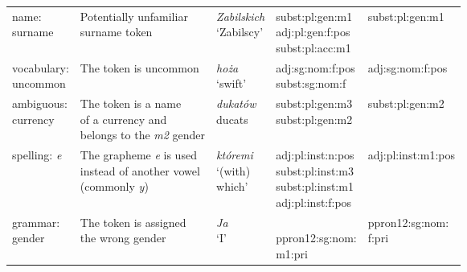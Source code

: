 \begin{longtable}[H]{p{2cm}p{4cm}p{1.5cm}p{3cm}p{3cm}}
\makecell[l]{name: \\ surname} & \makecell[l]{Potentially unfamiliar \\ surname token}  & \makecell[l]{\textit{Zabilskich} \\ `Zabilscy'} & \makecell[l]{subst:pl:gen:m1 \\ adj:pl:gen:f:pos \\ subst:pl:acc:m1} & subst:pl:gen:m1 \\ 

\makecell[l]{vocabulary: \\ uncommon} & The token is uncommon & \makecell[l]{\textit{hoża} \\ `swift'} & \makecell[l]{adj:sg:nom:f:pos \\ subst:sg:nom:f} & adj:sg:nom:f:pos \\ 

\makecell[l]{ambiguous: \\ currency} & \makecell[l]{The token is a name \\ of a currency and \\ belongs to the \textit{m2} gender} & \makecell[l]{\textit{dukatów} \\ ducats} & \makecell[l]{subst:pl:gen:m3 \\ subst:pl:gen:m2} & subst:pl:gen:m2 \\

spelling: \textit{e} & \makecell[l]{The grapheme \textit{e} is used \\ instead of another vowel \\ (commonly \textit{y})} & \makecell[l]{\textit{któremi} \\ `(with)\\which'} & \makecell[l]{adj:pl:inst:n:pos \\ subst:pl:inst:m3 \\ subst:pl:inst:m1 \\ adj:pl:inst:f:pos} & adj:pl:inst:m1:pos \\ 

\makecell[l]{grammar: \\ gender} & \makecell[l]{The token is assigned \\ the wrong gender} & \makecell[l]{\textit{Ja} \\ `I'} & \makecell[l]{\\ppron12:sg:nom:\\\hspace{0.5cm}m1:pri \\ {}} & \makecell[l]{ppron12:sg:nom:\\\hspace{0.5cm}f:pri} \\


\end{longtable}
